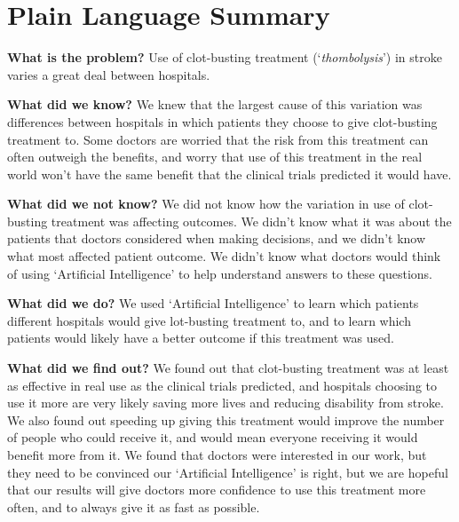 \section*{Plain Language Summary}

\textbf{What is the problem?} Use of clot-busting treatment (`\textit{thombolysis}') in stroke varies a great deal between hospitals.

\textbf{What did we know?} We knew that the largest cause of this variation was differences between hospitals in which patients they choose to give  clot-busting treatment to. Some doctors are worried that the risk from this treatment can often outweigh the benefits, and worry that use of this treatment in the real world won’t have the same benefit that the clinical trials predicted it would have.

\textbf{What did we not know?} We did not know how the variation in use of clot-busting treatment was affecting outcomes. We didn’t know what it was about the patients that doctors considered when making decisions, and we didn’t know what most affected patient outcome. We didn’t know what doctors would think of using ‘Artificial Intelligence’ to help understand answers to these questions.

\textbf{What did we do?} We used ‘Artificial Intelligence’ to learn which patients different hospitals would give lot-busting treatment to, and to learn which patients would likely have a better outcome if this treatment was used.

\textbf{What did we find out?} We found out that clot-busting treatment was at least as effective in real use as the clinical trials predicted, and hospitals choosing to use it more are very likely saving more lives and reducing disability from stroke. We also found out speeding up giving this treatment would improve the number of people who could receive it, and would mean everyone receiving it would benefit more from it. We found that doctors were interested in our work, but they need to be convinced our ‘Artificial Intelligence’ is right, but we are hopeful that our results will give doctors more confidence to use this treatment more often, and to always give it as fast as possible.